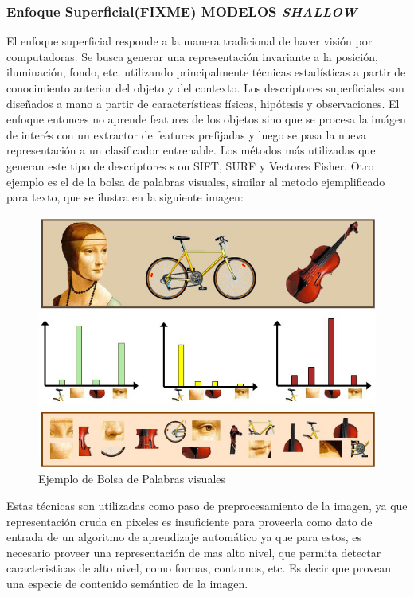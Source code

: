 \documentclass[a4paper,11pt,spanish]{book}
\newcommand*{\FIXME}[1]{{(\textbf{FIXME}) {#1}}}
\begin{document}
      \subsubsection{Enfoque Superficial\FIXME{MODELOS \emph{SHALLOW}}}
	El enfoque superficial responde a la manera tradicional de hacer visión por computadoras. Se busca generar una representación invariante a la posición, iluminación, fondo,
	etc. utilizando principalmente técnicas estadísticas a partir de conocimiento anterior del objeto y del contexto. Los descriptores superficiales son diseñados a mano a
	partir de características físicas, hipótesis y observaciones. El enfoque entonces no aprende features de los objetos sino que se procesa la imágen de interés con un
	extractor de features prefijadas y luego se pasa la nueva representación a un clasificador entrenable. Los métodos más utilizadas que generan este tipo de descriptores s
	on SIFT, SURF y Vectores Fisher.
	Otro ejemplo es el de la bolsa de palabras visuales, similar al metodo ejemplificado para texto, que se ilustra en la siguiente imagen:\\
	\begin{figure}[h]
	  \includegraphics[scale=0.5]{./img/bag_of_visual_words.jpg}
	  \caption{Ejemplo de Bolsa de Palabras visuales}
	  \label{fig:bovw}
	\end{figure}

	Estas técnicas son utilizadas como paso de preprocesamiento de la imagen, ya que representación cruda en pixeles es insuficiente para proveerla como dato de entrada de un algoritmo
	de aprendizaje automático ya que para estos, es necesario proveer una representación de mas alto nivel, que permita detectar caracteristicas de alto nivel,
	como formas, contornos, etc. Es decir que provean una especie de contenido semántico de la imagen.
\end{document}
